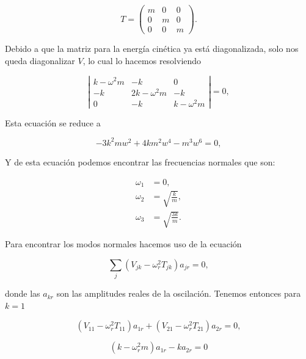 \documentclass[a4paper,10pt]{article}
\numberwithin{equation}{section}
\begin{document}
\begin{equation}
 T = \begin{pmatrix}
      m & 0 & 0 \\
      0 & m & 0 \\
      0 & 0 & m
     \end{pmatrix}.
\end{equation}

Debido a que la matriz para la energía cinética ya está diagonalizada, solo nos queda 
diagonalizar $V$, lo cual lo hacemos resolviendo

\begin{equation}
 \left| \begin{matrix}
	    k - \omega^2 m & -k & 0 \\
	    -k & 2k - \omega^2 m & -k \\
	    0 & -k & k - \omega^2 m
     \end{matrix}\right| = 0,
\end{equation}

Esta ecuación se reduce a 

\begin{equation}
 - 3 k^{2} m w^{2} + 4 k m^{2} w^{4} - m^{3} w^{6} = 0,
\end{equation}

Y de esta ecuación podemos encontrar las frecuencias normales que son:

\begin{align}
 \omega_1 &= 0, \\
 \omega_2 &= \sqrt{\frac{k}{m}}, \\
 \omega_3 &= \sqrt{\frac{3k}{m}}.
\end{align}

Para encontrar los modos normales hacemos uso de la ecuación

\begin{equation}
 \sum_j (V_{jk} - \omega^2_r T_{jk})a_{jr} = 0,
\end{equation}

donde las $a_{kr}$ son las amplitudes reales de la oscilación. Tenemos entonces 
para $k = 1$ 

\begin{equation}
 (V_{11} - \omega_r^2 T_{11})a_{1r} + (V_{21} - \omega_r^2 T_{21})a_{2r} = 0,
\end{equation}

\begin{equation}
 (k - \omega_r^2m)a_{1r} - k a_{2r} = 0 
\end{equation}
\end{document}
